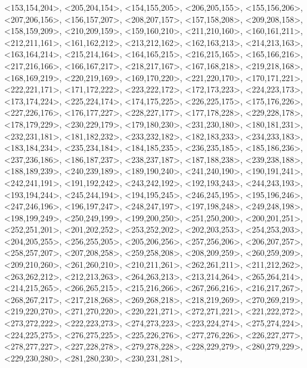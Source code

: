 \documentclass[a4paper,10pt]{article}
\begin{document}
\begin{eulernotebook}
\begin{euleroutput}
  <153,154,204>,
  <205,204,154>,
  <154,155,205>,
  <206,205,155>,
  <155,156,206>,
  <207,206,156>,
  <156,157,207>,
  <208,207,157>,
  <157,158,208>,
  <209,208,158>,
  <158,159,209>,
  <210,209,159>,
  <159,160,210>,
  <211,210,160>,
  <160,161,211>,
  <212,211,161>,
  <161,162,212>,
  <213,212,162>,
  <162,163,213>,
  <214,213,163>,
  <163,164,214>,
  <215,214,164>,
  <164,165,215>,
  <216,215,165>,
  <165,166,216>,
  <217,216,166>,
  <166,167,217>,
  <218,217,167>,
  <167,168,218>,
  <219,218,168>,
  <168,169,219>,
  <220,219,169>,
  <169,170,220>,
  <221,220,170>,
  <170,171,221>,
  <222,221,171>,
  <171,172,222>,
  <223,222,172>,
  <172,173,223>,
  <224,223,173>,
  <173,174,224>,
  <225,224,174>,
  <174,175,225>,
  <226,225,175>,
  <175,176,226>,
  <227,226,176>,
  <176,177,227>,
  <228,227,177>,
  <177,178,228>,
  <229,228,178>,
  <178,179,229>,
  <230,229,179>,
  <179,180,230>,
  <231,230,180>,
  <180,181,231>,
  <232,231,181>,
  <181,182,232>,
  <233,232,182>,
  <182,183,233>,
  <234,233,183>,
  <183,184,234>,
  <235,234,184>,
  <184,185,235>,
  <236,235,185>,
  <185,186,236>,
  <237,236,186>,
  <186,187,237>,
  <238,237,187>,
  <187,188,238>,
  <239,238,188>,
  <188,189,239>,
  <240,239,189>,
  <189,190,240>,
  <241,240,190>,
  <190,191,241>,
  <242,241,191>,
  <191,192,242>,
  <243,242,192>,
  <192,193,243>,
  <244,243,193>,
  <193,194,244>,
  <245,244,194>,
  <194,195,245>,
  <246,245,195>,
  <195,196,246>,
  <247,246,196>,
  <196,197,247>,
  <248,247,197>,
  <197,198,248>,
  <249,248,198>,
  <198,199,249>,
  <250,249,199>,
  <199,200,250>,
  <251,250,200>,
  <200,201,251>,
  <252,251,201>,
  <201,202,252>,
  <253,252,202>,
  <202,203,253>,
  <254,253,203>,
  <204,205,255>,
  <256,255,205>,
  <205,206,256>,
  <257,256,206>,
  <206,207,257>,
  <258,257,207>,
  <207,208,258>,
  <259,258,208>,
  <208,209,259>,
  <260,259,209>,
  <209,210,260>,
  <261,260,210>,
  <210,211,261>,
  <262,261,211>,
  <211,212,262>,
  <263,262,212>,
  <212,213,263>,
  <264,263,213>,
  <213,214,264>,
  <265,264,214>,
  <214,215,265>,
  <266,265,215>,
  <215,216,266>,
  <267,266,216>,
  <216,217,267>,
  <268,267,217>,
  <217,218,268>,
  <269,268,218>,
  <218,219,269>,
  <270,269,219>,
  <219,220,270>,
  <271,270,220>,
  <220,221,271>,
  <272,271,221>,
  <221,222,272>,
  <273,272,222>,
  <222,223,273>,
  <274,273,223>,
  <223,224,274>,
  <275,274,224>,
  <224,225,275>,
  <276,275,225>,
  <225,226,276>,
  <277,276,226>,
  <226,227,277>,
  <278,277,227>,
  <227,228,278>,
  <279,278,228>,
  <228,229,279>,
  <280,279,229>,
  <229,230,280>,
  <281,280,230>,
  <230,231,281>,

\end{euleroutput}
\end{eulernotebook}
\end{document}
